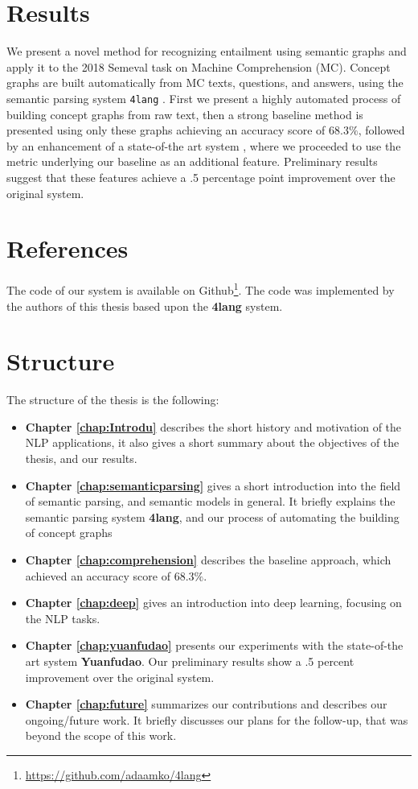 \section{Results}
We present a novel method for recognizing entailment using semantic
graphs and apply it to the 2018 Semeval task on Machine
Comprehension (MC).
Concept graphs are built automatically from MC texts, questions, and answers,
using the semantic parsing system \texttt{4lang} \cite{Recski:2016d}.
First we present a highly automated process of building concept graphs from raw text, then a strong baseline method is presented using only these graphs achieving an accuracy score of $68.3\%$,
followed by an enhancement of a state-of-the art system
\cite{Wang:2018}, where we proceeded to use the metric underlying our baseline as an additional feature. Preliminary results suggest that these features achieve a .5 percentage point improvement over the original system.

\section{References}
The code of our system is available on Github\footnote{\url{https://github.com/adaamko/4lang}}. The code was implemented by the authors of this thesis based upon the \textbf{4lang} system.

\section{Structure}
The structure of the thesis is the following:
\begin{itemize}
	\item \textbf{Chapter \ref{chap:Introdu}} describes the short history and motivation of the NLP applications, it also gives a short summary about the objectives of the thesis, and our results.
	\item \textbf{Chapter \ref{chap:semanticparsing}} gives a short introduction into the field of semantic parsing, and semantic models in general. It briefly explains the semantic parsing system \textbf{4lang}, and our process of automating the building of concept graphs
	\item \textbf{Chapter \ref{chap:comprehension}} describes the baseline approach, which achieved an accuracy score of $68.3\%$.
	\item \textbf{Chapter \ref{chap:deep}} gives an introduction into deep learning, focusing on the NLP tasks.
	\item \textbf{Chapter \ref{chap:yuanfudao}} presents our experiments with the state-of-the art system \textbf{Yuanfudao}. Our preliminary results show a .5 percent improvement over the original system.
	\item \textbf{Chapter \ref{chap:future}} summarizes our contributions and describes our ongoing/future work. It briefly discusses our plans for the follow-up, that was beyond the scope of this work.
\end{itemize}